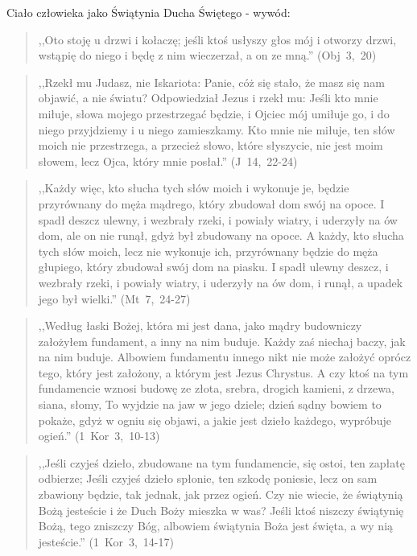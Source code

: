 \documentclass[10pt,a4paper,oneside]{article}
\begin{document}
Ciało człowieka jako Świątynia Ducha Świętego - wywód:
\begin{quote}
,,Oto stoję u drzwi i kołaczę; jeśli ktoś usłyszy głos mój i otworzy drzwi, wstąpię do niego i będę z nim wieczerzał, a on ze mną.'' (Obj~3,~20)
\end{quote}
\begin{quote}
,,Rzekł mu Judasz, nie Iskariota: Panie, cóż się stało, że masz się nam objawić, a nie światu? Odpowiedział Jezus i rzekł mu: Jeśli kto mnie miłuje, słowa mojego przestrzegać będzie, i Ojciec mój umiłuje go, i do niego przyjdziemy i u niego zamieszkamy. Kto mnie nie miłuje, ten słów moich nie przestrzega, a przecież słowo, które słyszycie, nie jest moim słowem, lecz Ojca, który mnie posłał.'' (J~14,~22-24)
\end{quote}
\begin{quote}
,,Każdy więc, kto słucha tych słów moich i wykonuje je, będzie przyrównany do męża mądrego, który zbudował dom swój na opoce. I spadł deszcz ulewny, i wezbrały rzeki, i powiały wiatry, i uderzyły na ów dom, ale on nie runął, gdyż był zbudowany na opoce. A każdy, kto słucha tych słów moich, lecz nie wykonuje ich, przyrównany będzie do męża głupiego, który zbudował swój dom na piasku. I spadł ulewny deszcz, i wezbrały rzeki, i powiały wiatry, i uderzyły na ów dom, i runął, a upadek jego był wielki.'' (Mt~7,~24-27)
\end{quote}
\begin{quote}
,,Według łaski Bożej, która mi jest dana, jako mądry budowniczy założyłem fundament, a inny na nim buduje. Każdy zaś niechaj baczy, jak na nim buduje. Albowiem fundamentu innego nikt nie może założyć oprócz tego, który jest założony, a którym jest Jezus Chrystus. A czy ktoś na tym fundamencie wznosi budowę ze złota, srebra, drogich kamieni, z drzewa, siana, słomy, To wyjdzie na jaw w jego dziele; dzień sądny bowiem to pokaże, gdyż w ogniu się objawi, a jakie jest dzieło każdego, wypróbuje ogień.'' (1~Kor~3,~10-13)
\end{quote}
\begin{quote}
,,Jeśli czyjeś dzieło, zbudowane na tym fundamencie, się ostoi, ten zapłatę odbierze; Jeśli czyjeś dzieło spłonie, ten szkodę poniesie, lecz on sam zbawiony będzie, tak jednak, jak przez ogień. Czy nie wiecie, że świątynią Bożą jesteście i że Duch Boży mieszka w was? Jeśli ktoś niszczy świątynię Bożą, tego zniszczy Bóg, albowiem świątynia Boża jest święta, a wy nią jesteście.'' (1~Kor~3,~14-17)
\end{quote}
\end{document}
